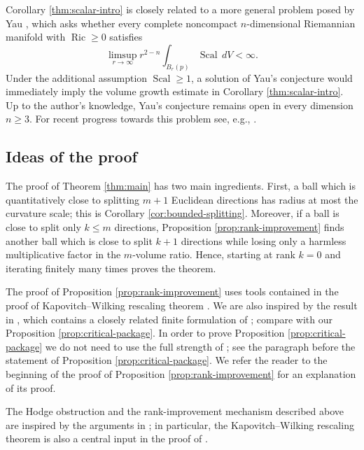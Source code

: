 \documentclass[11pt]{amsart}
\theoremstyle{definition}
\theoremstyle{remark}
\DeclareMathOperator{\Ric}{Ric}
\DeclareMathOperator{\Scal}{Scal}
\begin{document}
{
Corollary \ref{thm:scalar-intro} is closely related to a more general problem posed by Yau \cite{YauProblems}, which asks whether every
complete noncompact $n$-dimensional Riemannian manifold with $\Ric\geq0$ satisfies
\[
       \limsup_{r\to\infty} r^{2-n}
       \int_{B_r(p)}\Scal\,dV <\infty.
\]
Under the additional assumption $\Scal\geq1$, a solution of Yau's conjecture would immediately
imply the volume growth estimate in Corollary \ref{thm:scalar-intro}. Up to the author's knowledge, Yau's conjecture remains open in every dimension $n\geq 3$. For recent progress towards this problem see, e.g., \cite{CucinottaMondino, MunteanuWangIntegral}.
}

\subsection*{Ideas of the proof}

The proof of Theorem \ref{thm:main} has two main ingredients. First, a ball which is quantitatively
close to splitting $m+1$ Euclidean directions has radius at most the
curvature scale; this is Corollary \ref{cor:bounded-splitting}.  Moreover, if a ball is close to
split only $k\leq m$ directions, Proposition \ref{prop:rank-improvement}
finds another ball which is close to split $k+1$ directions while losing only a
harmless multiplicative factor in the $m$-volume ratio. Hence, starting at rank $k=0$
and iterating finitely many times proves the theorem.

The proof of Proposition \ref{prop:rank-improvement} uses tools contained in the proof of
Kapovitch--Wilking rescaling theorem
\cite[Theorem~5.1]{KapovitchWilking}.
We are also inspired by the result in \cite[Lemma~2.12]{Jansen}, which contains a closely related finite formulation of \cite[Theorem 5.1]{KapovitchWilking}; compare with our Proposition \ref{prop:critical-package}. In order to prove Proposition \ref{prop:critical-package} we do not need to use the full strength of \cite[Theorem 5.1]{KapovitchWilking}; see the paragraph before the statement of Proposition \ref{prop:critical-package}. We refer the reader to the beginning of the proof of Proposition \ref{prop:rank-improvement} for an explanation of its proof.
\vspace{0.1cm}

The Hodge
obstruction and the rank-improvement mechanism described above are inspired by
the arguments in \cite{CucinottaMondino, WangXieZhuZhu, XZhu}; in particular, the
Kapovitch--Wilking rescaling theorem
\cite[Theorem~5.1]{KapovitchWilking} is also a
central input in the proof of \cite[Theorem~1.6]{XZhu}.
\end{document}
